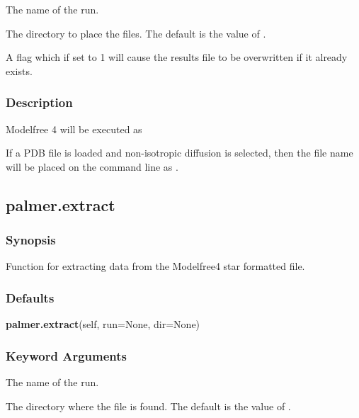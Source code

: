   The name of the run. 

  The directory to place the files.  The default is the value of . 

  A flag which if set to 1 will cause the results file to be overwritten if it already exists. 




\subsubsection{Description}

Modelfree 4 will be executed as




If a PDB file is loaded and non-isotropic diffusion is selected, then the file name will be placed on the command line as .




\newpage

\subsection{palmer.extract}


\subsubsection{Synopsis}

Function for extracting data from the Modelfree4  star formatted file.



\subsubsection{Defaults}

\textsf{\textbf{palmer.extract}(self, run=None, dir=None)}


\subsubsection{Keyword Arguments}

  The name of the run. 

  The directory where the file  is found.  The default is the value of . 





